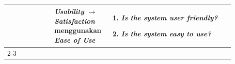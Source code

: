 \begin{longtable}{|p{0.2\linewidth}|p{0.2\linewidth}|p{0.53\linewidth}|}
                                                                  & \textbf{\textit{Usability} $\rightarrow$ \textit{Satisfaction}} menggunakan \textbf{\textit{Ease of Use}}                                               & \begin{enumerate}[before=\vspace{-8pt}, leftmargin=*, nosep, series=SEU] \item \textit{Is the system user friendly?} \item \textit{Is the system easy to use?} \end{enumerate}                                                                                                                                                                                                                                                                                                                                                                                                                                                                                                                                                                                                                                                                                                                                                                                                                                                                                                                                                                                                                                                                                                                                                                                                                                               \\
      \cline{2-3}


\end{longtable}
